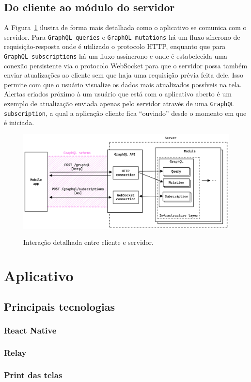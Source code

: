 \subsection{Do cliente ao módulo do servidor}

A Figura~\ref{f.system_server_api} ilustra de forma mais detalhada como o aplicativo se comunica com o servidor. Para \texttt{GraphQL queries} e \texttt{GraphQL mutations} há um fluxo síncrono de requisição-resposta onde é utilizado o protocolo HTTP, enquanto que para \texttt{GraphQL subscriptions} há um fluxo assíncrono e onde é estabelecida uma conexão persistente via o protocolo WebSocket para que o servidor possa também enviar atualizações ao cliente sem que haja uma requisição prévia feita dele. Isso permite com que o usuário visualize os dados mais atualizados possíveis na tela. Alertas criados próximo à um usuário que está com o aplicativo aberto é um exemplo de atualização enviada apenas pelo servidor através de uma \texttt{GraphQL subscription}, a qual a aplicação cliente fica ``ouvindo'' desde o momento em que é iniciada.

\begin{figure}[htbp]
	\caption{\small Interação detalhada entre cliente e servidor.}
	\centering
	\includegraphics[width=\textwidth]{../diagrams/out/system_server_api.png}
	\label{f.system_server_api}
\end{figure}

\FloatBarrier

\section{Aplicativo} %




\subsection{Principais tecnologias}

\subsubsection{React Native}

\subsubsection{Relay}

\subsubsection{Print das telas}

